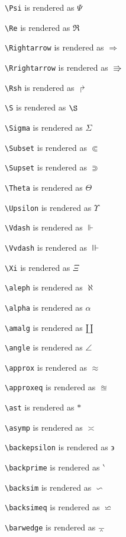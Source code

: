 \texttt{\textbackslash Psi} is rendered as $\Psi$

\texttt{\textbackslash Re} is rendered as $\Re$

\texttt{\textbackslash Rightarrow} is rendered as $\Rightarrow$

\texttt{\textbackslash Rrightarrow} is rendered as $\Rrightarrow$

\texttt{\textbackslash Rsh} is rendered as $\Rsh$

\texttt{\textbackslash S} is rendered as $\S$

\texttt{\textbackslash Sigma} is rendered as $\Sigma$

\texttt{\textbackslash Subset} is rendered as $\Subset$

\texttt{\textbackslash Supset} is rendered as $\Supset$

\texttt{\textbackslash Theta} is rendered as $\Theta$

\texttt{\textbackslash Upsilon} is rendered as $\Upsilon$

\texttt{\textbackslash Vdash} is rendered as $\Vdash$

\texttt{\textbackslash Vvdash} is rendered as $\Vvdash$

\texttt{\textbackslash Xi} is rendered as $\Xi$

\texttt{\textbackslash aleph} is rendered as $\aleph$

\texttt{\textbackslash alpha} is rendered as $\alpha$

\texttt{\textbackslash amalg} is rendered as $\amalg$

\texttt{\textbackslash angle} is rendered as $\angle$

\texttt{\textbackslash approx} is rendered as $\approx$

\texttt{\textbackslash approxeq} is rendered as $\approxeq$

\texttt{\textbackslash ast} is rendered as $\ast$

\texttt{\textbackslash asymp} is rendered as $\asymp$

\texttt{\textbackslash backepsilon} is rendered as $\backepsilon$

\texttt{\textbackslash backprime} is rendered as $\backprime$

\texttt{\textbackslash backsim} is rendered as $\backsim$

\texttt{\textbackslash backsimeq} is rendered as $\backsimeq$

\texttt{\textbackslash barwedge} is rendered as $\barwedge$

